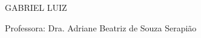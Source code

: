 \begin{capa}
	\begin{center}
		\Large\imprimirinstituicao
	\end{center}
	
	\begin{center}
		\vspace*{3.4cm}
		\Large GABRIEL LUIZ
		\vspace*{1.5cm}
		
		\Large \textbf{\imprimirtitulo}
		
		\vspace*{3.4cm}
		
		\noindent Professora: Dra. Adriane Beatriz de Souza Serapião
		
		\vspace*{3.4cm}
		
		{\large\imprimirlocal}
		\par
		{\large\imprimirdata}
		\vspace*{1cm}
	\end{center}
\end{capa}
